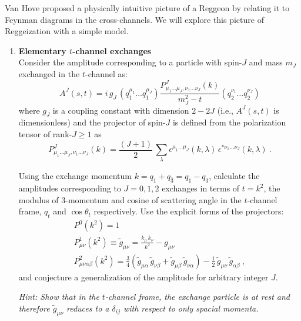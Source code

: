 Van Hove proposed a physically intuitive picture of a Reggeon by relating it to Feynman diagrams in the cross-channels. We will explore this picture of Reggeization with a simple model.

\begin{enumerate}
    \item \textbf{Elementary $t$-channel exchanges} \\
          Consider the amplitude corresponding to a particle with spin-$J$ and mass $m_J$  exchanged in the $t$-channel as:
          \begin{equation}
              \label{eq:AJ}
              A^J(s,t) = i \, g_J \, \left( q_1^{\mu_1} \dots q_1^{\mu_J} \right) \frac{P^J_{\mu_1\dots\mu_J,\nu_1\dots\nu_J}(k)}{m_J^2 - t} \left( q_{\bar{2}}^{\nu_1} \dots q_{\bar{2}}^{\nu_J} \right)
          \end{equation}
          where $g_J$ is a coupling constant with dimension $2-2J$ (i.e., $A^J(s,t)$ is dimensionless) and the projector of spin-$J$ is defined from the polarization tensor of rank-$J\geq1$ as
          \begin{equation}
              P^J_{\mu_1\dots\mu_J,\nu_1\dots\nu_J}(k) = \frac{(J+1)}{2} \, \sum_{\lambda}
              \epsilon^{\mu_1\dots\mu_J}(k,\lambda) \, \epsilon^{*\nu_1\dots\nu_J}(k,\lambda) ~.
          \end{equation}

          Using the exchange momentum $k = q_1 + q_{\bar{3}} = q_1 - q_3$, calculate the amplitudes corresponding to $J=0,1,2$ exchanges in terms of $t= k^2$, the modulus of 3-momentum and cosine of scattering angle in the $t$-channel frame, $q_t$ and $\cos\theta_t$ respectively. Use the explicit forms of the projectors:
          \begin{gather}
              P^0(k^2) = 1 \\
              P^1_{\mu\nu}(k^2) \equiv \tilde{g}_{\mu\nu} =   \frac{ k_\mu \, k_\nu}{ k^2} - g_{\mu\nu}\\
              P^2_{\mu\nu\alpha\beta}(k^2) = \frac{3}{4}\left(\tilde{g}_{\mu\alpha} \, \tilde{g}_{\nu\beta} + \tilde{g}_{\mu\beta} \, \tilde{g}_{\nu\alpha}\right) - \frac{1}{2} \, \tilde{g}_{\mu\nu} \, \tilde{g}_{\alpha\beta} ~,
          \end{gather}
          and conjecture a generalization of the amplitude for arbitrary integer $J$.

          \noindent\textit{Hint: Show that in the $t$-channel frame, the exchange particle is at rest and therefore $\tilde{g}_{\mu\nu}$ reduces to a $\delta_{ij}$ with respect to only spacial momenta.}


\end{enumerate}
